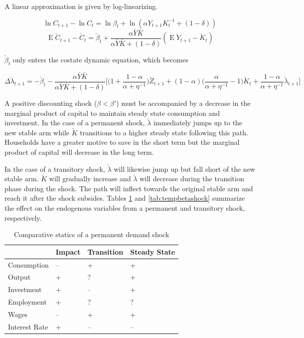 \documentclass[11pt]{article}
\DeclareMathOperator{\ev}{E}
\begin{document}
    A linear approximation is given by log-linearizing.

        $$ \ln C_{t+1} - \ln C_t = \ln \beta_t + \ln (\alpha Y_{t+1} K_t^{-1} + (1-\delta)) $$
        $$ \ev \check C_{t+1} - \check C_t = \check \beta_t + \frac{\alpha \bar Y \bar K}{\alpha \bar Y \bar K + (1-\delta)} (\ev \check Y_{t+1} - \check K_t) $$

    $\check \beta_t$ only enters the costate dynamic equation, which becomes

        $$ \Delta \check \lambda_{t+1} = - \check \beta_t - \frac{\alpha \bar Y \bar K}{\alpha \bar Y \bar K + (1-\delta)} \bigg [ \bigg ( 1 + \frac{1-\alpha}{\alpha+\eta^{-1}} \bigg ) \check Z_{t+1} + (1-\alpha) \bigg ( \frac{\alpha}{\alpha + \eta^{-1}} - 1 \bigg ) \check K_t + \frac{1-\alpha}{\alpha+\eta^{-1}} \check \lambda_{t+1} \bigg ] $$

    A positive discounting shock ($\beta < \beta'$) must be accompanied by a decrease in the marginal product of capital to maintain steady state consumption and investment. In the case of a permanent shock, $\check \lambda$ immediately jumps up to the new stable arm while $\check K$ transitions to a higher steady state following this path. Households have a greater motive to save in the short term but the marginal product of capital will decrease in the long term.

    In the case of a transitory shock, $\check \lambda$ will likewise jump up but fall short of the new stable arm. $\check K$ will gradually increase and $\check \lambda$ will decrease during the transition phase during the shock. The path will inflect towards the original stable arm and reach it after the shock subsides. Tables \ref{tab:permbetashock} and \ref{tab:tempbetashock} summarize the effect on the endogenous variables from a permanent and transitory shock, respectively.

    \begin{table}[h] \centering
    \caption{Comparative statics of a permanent demand shock}
    \label{tab:permbetashock}
    \begin{tabular}{p{2.5cm}p{2.5cm}p{2.5cm}p{2.5cm}}
    \hline
     & Impact & Transition & Steady State \tabularnewline
    \hline
    Consumption & -- & + & + \tabularnewline
    Output & + & ? & + \tabularnewline
    Investment & + & -- & + \tabularnewline
    Employment & + & ? & ? \tabularnewline
    Wages & -- & + & + \tabularnewline
    Interest Rate & + & -- & -- \tabularnewline
    \hline
    \end{tabular}
    \end{table}
\end{document}
